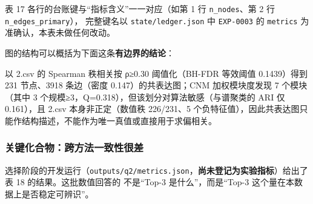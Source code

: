 \documentclass[
  a4paper,12pt]{article}
\begin{document}
表 17 各行的台账键与``指标含义''一一对应（如第 1 行
\texttt{n\_nodes}、第 2 行 \texttt{n\_edges\_primary}）， 完整键名以
\texttt{state/ledger.json} 中 \texttt{EXP-0003} 的 \texttt{metrics}
为准确认，本表未做任何改动。

图的结构可以概括为下面这条\textbf{有边界的结论}：

以 2.csv 的 Spearman 秩相关按 \textbar ρ\textbar≥0.30 阈值化（BH-FDR
等效阈值 0.1439）得到 231 节点、3918 条边（密度 0.147）的共表达图；CNM
加权模块度发现 7 个模块（其中 3
个规模≥3，Q=0.318），但该划分对算法敏感（与谱聚类的 ARI 仅 0.161），且
2.csv 本身非正定（数值秩 226/231、5
个负特征值），因此共表达图只能作结构描述，不能作为唯一真值或直接用于求偏相关。

\subsubsection{关键化合物：跨方法一致性很差}\label{ux5173ux952eux5316ux5408ux7269ux8de8ux65b9ux6cd5ux4e00ux81f4ux6027ux5f88ux5dee}

选择阶段的开发运行（\texttt{outputs/q2/metrics.json}，\textbf{尚未登记为实验指标}）给出了表
18 的结果。这批数值回答的 不是``Top-3 是什么''，而是``Top-3
这个量在本数据上是否稳定可辨识''。
\end{document}
